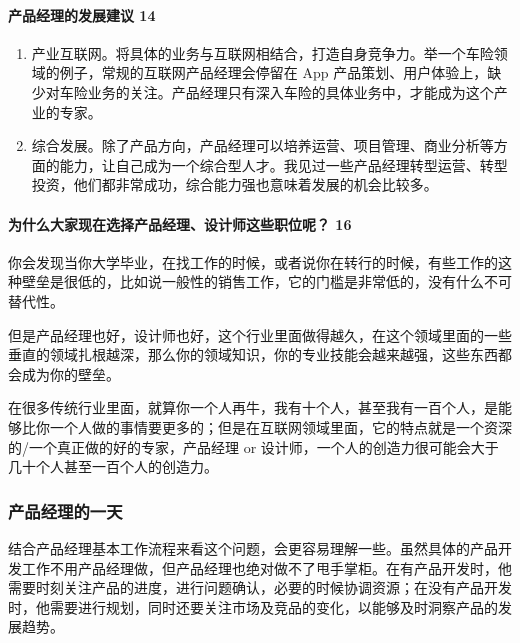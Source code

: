 \documentclass[letterpaper,11pt,english]{sphinxmanual}
\begin{document}
\paragraph{产品经理的发展建议 14\sphinxfootnotemark[613]}
\label{\detokenize{chapter_experience/career_path:id23}}%
\begin{footnotetext}[613]\sphinxAtStartFootnote
{}
%
\end{footnotetext}\ignorespaces \begin{enumerate}
%
\item {} 
产业互联网。将具体的业务与互联网相结合，打造自身竞争力。举一个车险领域的例子，常规的互联网产品经理会停留在
App
产品策划、用户体验上，缺少对车险业务的关注。产品经理只有深入车险的具体业务中，才能成为这个产业的专家。

\item {} 
综合发展。除了产品方向，产品经理可以培养运营、项目管理、商业分析等方面的能力，让自己成为一个综合型人才。我见过一些产品经理转型运营、转型投资，他们都非常成功，综合能力强也意味着发展的机会比较多。

\end{enumerate}


\paragraph{为什么大家现在选择产品经理、设计师这些职位呢？ 16\sphinxfootnotemark[614]}
\label{\detokenize{chapter_experience/career_path:id24}}%
\begin{footnotetext}[614]\sphinxAtStartFootnote
{}
%
\end{footnotetext}\ignorespaces 
你会发现当你大学毕业，在找工作的时候，或者说你在转行的时候，有些工作的这种壁垒是很低的，比如说一般性的销售工作，它的门槛是非常低的，没有什么不可替代性。

但是产品经理也好，设计师也好，这个行业里面做得越久，在这个领域里面的一些垂直的领域扎根越深，那么你的领域知识，你的专业技能会越来越强，这些东西都会成为你的壁垒。

在很多传统行业里面，就算你一个人再牛，我有十个人，甚至我有一百个人，是能够比你一个人做的事情要更多的；但是在互联网领域里面，它的特点就是一个资深的/一个真正做的好的专家，产品经理
or 设计师，一个人的创造力很可能会大于几十个人甚至一百个人的创造力。


\subsubsection{产品经理的一天}
\label{\detokenize{chapter_experience/1Day:id1}}\label{\detokenize{chapter_experience/1Day::doc}}
结合产品经理基本工作流程来看这个问题，会更容易理解一些。虽然具体的产品开发工作不用产品经理做，但产品经理也绝对做不了甩手掌柜。在有产品开发时，他需要时刻关注产品的进度，进行问题确认，必要的时候协调资源；在没有产品开发时，他需要进行规划，同时还要关注市场及竞品的变化，以能够及时洞察产品的发展趋势。
\end{document}
